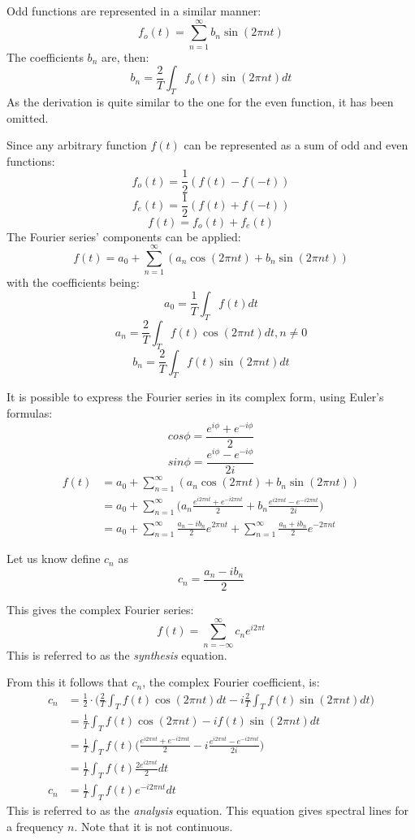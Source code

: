 \documentclass{article}
\begin{document}
Odd functions are represented in a similar manner:
$$f_o(t) = \sum^{\infty}_{n=1} b_n \sin(2 \pi n t)$$
The coefficients $b_n$ are, then:
$$b_n = \frac{2}{T}\int_T f_o(t) \sin(2 \pi n t) dt$$
As the derivation is quite similar to the one for the even function, it has 
been omitted.

Since any arbitrary function $f(t)$ can be represented as a sum of odd and even 
functions:
$$f_o(t) = \frac{1}{2}(f(t) - f(-t))$$
$$f_e(t) = \frac{1}{2}(f(t) + f(-t))$$
$$f(t) = f_o(t) + f_e(t)$$
The Fourier series' components can be applied:
$$f(t) = a_0 + \sum^{\infty}_{n=1} (a_n \cos(2 \pi n t) + b_n \sin(2 \pi n t))$$
with the coefficients being:
$$a_0 = \frac{1}{T} \int_T f(t) dt$$
$$a_n = \frac{2}{T} \int_T f(t) \cos(2 \pi n t) dt, n \neq 0$$
$$b_n = \frac{2}{T} \int_T f(t) \sin(2 \pi n t) dt$$

It is possible to express the Fourier series in its complex form, using 
Euler's formulas:
$$cos \phi = \frac{e^{i\phi} + e^{-i\phi}}{2}$$
$$sin \phi = \frac{e^{i\phi} - e^{-i\phi}}{2i}$$
\begin{equation*}
	\begin{aligned}
		f(t) &=
		a_0 + \sum^{\infty}_{n=1}(a_n \cos(2 \pi n t) + b_n \sin(2 \pi n t)) \\
		& = a_0 + \sum^{\infty}_{n=1}\Big(
		a_n \frac{e^{i 2 \pi n t} + e^{-i 2 \pi n t}}{2} + 
		b_n \frac{e^{i 2 \pi n t} - e^{-i 2 \pi n t}}{2i}\Big) \\
		&= a_0 + \sum^{\infty}_{n=1} \frac{a_n - ib_n}{2}e^{2 \pi n t} +
		\sum^{\infty}_{n=1} \frac{a_n + ib_n}{2} e^{-2 \pi n t}
	\end{aligned}
\end{equation*}

Let us know define $c_n$ as 
$$c_n = \frac{a_n - i b_n}{2}$$

This gives the complex Fourier series:
\begin{equation*}
	f(t) = \sum^{\infty}_{n = - \infty} c_n e^{i 2 \pi t}
\end{equation*}
This is referred to as the \textit{synthesis} equation.

From this it follows that $c_n$, the complex Fourier coefficient, is:
\begin{equation*}
	\begin{aligned}
		c_n &= 
		\frac{1}{2} \cdot \bigg( \frac{2}{T} \int_T f(t) \cos(2 \pi n t) dt - 
		i \frac{2}{T} \int_T f(t) \sin(2 \pi n t) dt \bigg) \\
		&= \frac{1}{T} \int_T f(t) \cos(2 \pi n t) - i f(t) \sin(2 \pi n t) dt \\
		&= \frac{1}{T} \int_T f(t) \bigg( 
			\frac{e^{i 2 \pi n t} + e^{-i 2 \pi n t}}{2} - 
		i \frac{e^{i 2 \pi n t} - e^{-i 2 \pi n t}}{2i} \bigg) \\
		&= \frac{1}{T} \int_T f(t) \frac{2 e^{i 2 \pi n t}}{2} dt \\
		c_n &= \frac{1}{T} \int_T f(t) e^{-i 2 \pi n t} dt
	\end{aligned}
\end{equation*}
This is referred to as the \textit{analysis} equation. This equation gives 
spectral lines for a frequency $n$. Note that it is not continuous.
\end{document}
